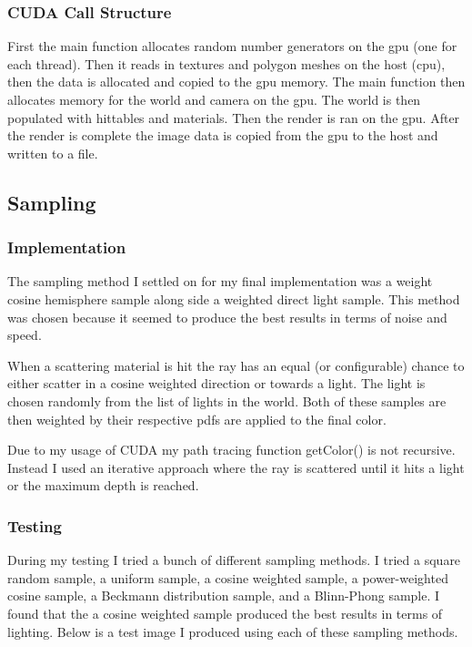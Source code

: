 \documentclass{article}
\begin{document}
        \subsubsection{CUDA Call Structure}
        First the main function allocates random number generators on the gpu (one for each thread). Then it reads in textures and polygon meshes on the host (cpu), then the data is allocated and copied to the gpu memory. The main function then allocates memory for the world and camera on the gpu. The world is then populated with hittables and materials. Then the render is ran on the gpu. After the render is complete the image data is copied from the gpu to the host and written to a file. \par



    \subsection{Sampling}



        \subsubsection{Implementation}
        The sampling method I settled on for my final implementation was a weight cosine hemisphere sample along side a weighted direct light sample. This method was chosen because it seemed to produce the best results in terms of noise and speed. \par
        When a scattering material is hit the ray has an equal (or configurable) chance to either scatter in a cosine weighted direction or towards a light. The light is chosen randomly from the list of lights in the world. Both of these samples are then weighted by their respective pdfs are applied to the final color. \par
        Due to my usage of CUDA my path tracing function getColor() is not recursive. Instead I used an iterative approach where the ray is scattered until it hits a light or the maximum depth is reached. \par 



        \subsubsection{Testing}
        During my testing I tried a bunch of different sampling methods. I tried a square random sample, a uniform sample, a cosine weighted sample, a power-weighted cosine sample, a Beckmann distribution sample, and a Blinn-Phong sample. I found that the a cosine weighted sample produced the best results in terms of lighting. Below is a test image I produced using each of these sampling methods. \par
\end{document}
